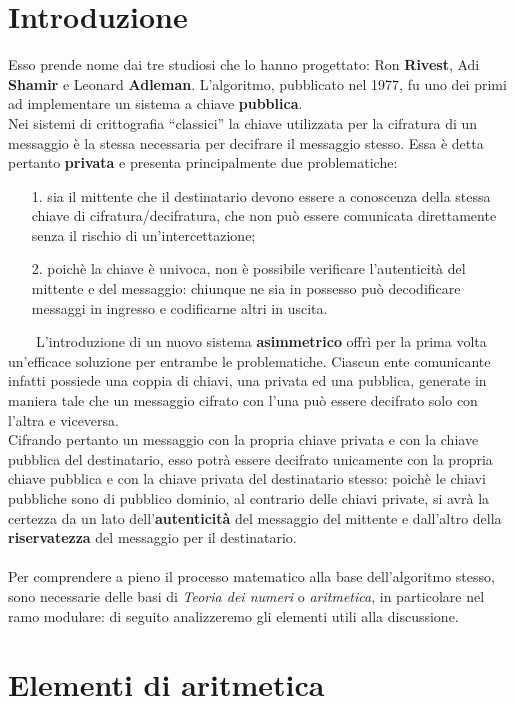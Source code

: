 \documentclass[a4paper,12pt]{article}
\begin{document}
\section*{Introduzione}
Esso prende nome dai tre studiosi che lo hanno progettato: Ron \textbf{Rivest}, Adi \textbf{Shamir} e Leonard \textbf{Adleman}. L'algoritmo, pubblicato nel 1977, fu uno dei primi ad implementare un sistema a chiave \textbf{pubblica}.\\
Nei sistemi di crittografia ``classici'' la chiave utilizzata per la cifratura di un messaggio è la stessa necessaria per decifrare il messaggio stesso. Essa è detta pertanto \textbf{privata} e presenta principalmente due problematiche:
\begin{enumerate}
    \item[1.] sia il mittente che il destinatario devono essere a conoscenza della stessa chiave di cifratura/decifratura, che non può essere comunicata direttamente senza il rischio di un'intercettazione;
    \item[2.] poichè la chiave è univoca, non è possibile verificare l'autenticità del mittente e del messaggio: chiunque ne sia in possesso può decodificare messaggi in ingresso e codificarne altri in uscita.
\end{enumerate}
\ \ \ \ L'introduzione di un nuovo sistema \textbf{asimmetrico} offrì per la prima volta un'efficace soluzione per entrambe le problematiche. Ciascun ente comunicante infatti possiede una coppia di chiavi, una privata ed una pubblica, generate in maniera tale che un messaggio cifrato con l'una può essere decifrato solo con l'altra e viceversa.\\
Cifrando pertanto un messaggio con la propria chiave privata e con la chiave pubblica del destinatario, esso potrà essere decifrato unicamente con la propria chiave pubblica e con la chiave privata del destinatario stesso: poichè le chiavi pubbliche sono di pubblico dominio, al contrario delle chiavi private, si avrà la certezza da un lato dell'\textbf{autenticità} del messaggio del mittente e dall'altro della \textbf{riservatezza} del messaggio per il destinatario.\\\\
Per comprendere a pieno il processo matematico alla base dell'algoritmo stesso, sono necessarie delle basi di \emph{Teoria dei numeri} o \emph{aritmetica}, in particolare nel ramo modulare: di seguito analizzeremo gli elementi utili alla discussione.
\newpage
\section{Elementi di aritmetica}
\end{document}
